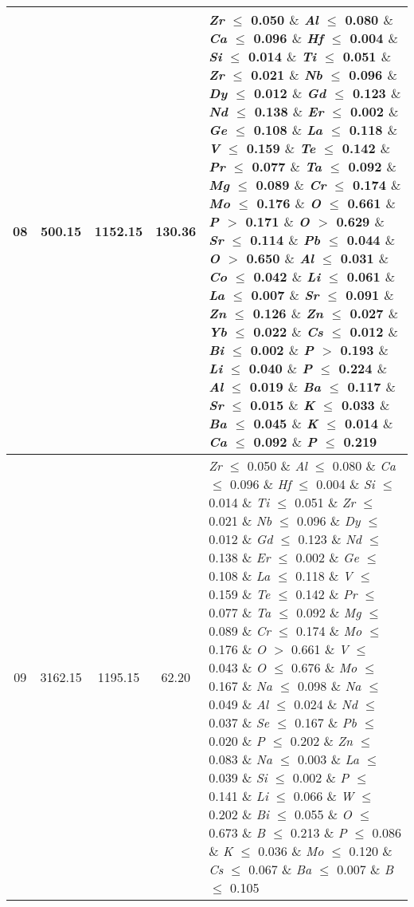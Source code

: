 \begin{table}[!htbp]
\begin{tabular}{ccccp{}}
		08 & 500.15 & 1152.15 & 130.36 & \textit{Zr} $\le$ 0.050 $\&$ \textit{Al} $\le$ 0.080 $\&$ \textit{Ca} $\le$ 0.096 $\&$ \textit{Hf} $\le$ 0.004 $\&$ \textit{Si} $\le$ 0.014 $\&$ \textit{Ti} $\le$ 0.051 $\&$ \textit{Zr} $\le$ 0.021 $\&$ \textit{Nb} $\le$ 0.096 $\&$ \textit{Dy} $\le$ 0.012 $\&$ \textit{Gd} $\le$ 0.123 $\&$ \textit{Nd} $\le$ 0.138 $\&$ \textit{Er} $\le$ 0.002 $\&$ \textit{Ge} $\le$ 0.108 $\&$ \textit{La} $\le$ 0.118 $\&$ \textit{V} $\le$ 0.159 $\&$ \textit{Te} $\le$ 0.142 $\&$ \textit{Pr} $\le$ 0.077 $\&$ \textit{Ta} $\le$ 0.092 $\&$ \textit{Mg} $\le$ 0.089 $\&$ \textit{Cr} $\le$ 0.174 $\&$ \textit{Mo} $\le$ 0.176 $\&$ \textit{O} $\le$ 0.661 $\&$ \textit{P} $>$ 0.171 $\&$ \textit{O} $>$ 0.629 $\&$ \textit{Sr} $\le$ 0.114 $\&$ \textit{Pb} $\le$ 0.044 $\&$ \textit{O} $>$ 0.650 $\&$ \textit{Al} $\le$ 0.031 $\&$ \textit{Co} $\le$ 0.042 $\&$ \textit{Li} $\le$ 0.061 $\&$ \textit{La} $\le$ 0.007 $\&$ \textit{Sr} $\le$ 0.091 $\&$ \textit{Zn} $\le$ 0.126 $\&$ \textit{Zn} $\le$ 0.027 $\&$ \textit{Yb} $\le$ 0.022 $\&$ \textit{Cs} $\le$ 0.012 $\&$ \textit{Bi} $\le$ 0.002 $\&$ \textit{P} $>$ 0.193 $\&$ \textit{Li} $\le$ 0.040 $\&$ \textit{P} $\le$ 0.224 $\&$ \textit{Al} $\le$ 0.019 $\&$ \textit{Ba} $\le$ 0.117 $\&$ \textit{Sr} $\le$ 0.015 $\&$ \textit{K} $\le$ 0.033 $\&$ \textit{Ba} $\le$ 0.045 $\&$ \textit{K} $\le$ 0.014 $\&$ \textit{Ca} $\le$ 0.092 $\&$ \textit{P} $\le$ 0.219\\
		\hline
		09 & 3162.15 & 1195.15 & 62.20 & \textit{Zr} $\le$ 0.050 $\&$ \textit{Al} $\le$ 0.080 $\&$ \textit{Ca} $\le$ 0.096 $\&$ \textit{Hf} $\le$ 0.004 $\&$ \textit{Si} $\le$ 0.014 $\&$ \textit{Ti} $\le$ 0.051 $\&$ \textit{Zr} $\le$ 0.021 $\&$ \textit{Nb} $\le$ 0.096 $\&$ \textit{Dy} $\le$ 0.012 $\&$ \textit{Gd} $\le$ 0.123 $\&$ \textit{Nd} $\le$ 0.138 $\&$ \textit{Er} $\le$ 0.002 $\&$ \textit{Ge} $\le$ 0.108 $\&$ \textit{La} $\le$ 0.118 $\&$ \textit{V} $\le$ 0.159 $\&$ \textit{Te} $\le$ 0.142 $\&$ \textit{Pr} $\le$ 0.077 $\&$ \textit{Ta} $\le$ 0.092 $\&$ \textit{Mg} $\le$ 0.089 $\&$ \textit{Cr} $\le$ 0.174 $\&$ \textit{Mo} $\le$ 0.176 $\&$ \textit{O} $>$ 0.661 $\&$ \textit{V} $\le$ 0.043 $\&$ \textit{O} $\le$ 0.676 $\&$ \textit{Mo} $\le$ 0.167 $\&$ \textit{Na} $\le$ 0.098 $\&$ \textit{Na} $\le$ 0.049 $\&$ \textit{Al} $\le$ 0.024 $\&$ \textit{Nd} $\le$ 0.037 $\&$ \textit{Se} $\le$ 0.167 $\&$ \textit{Pb} $\le$ 0.020 $\&$ \textit{P} $\le$ 0.202 $\&$ \textit{Zn} $\le$ 0.083 $\&$ \textit{Na} $\le$ 0.003 $\&$ \textit{La} $\le$ 0.039 $\&$ \textit{Si} $\le$ 0.002 $\&$ \textit{P} $\le$ 0.141 $\&$ \textit{Li} $\le$ 0.066 $\&$ \textit{W} $\le$ 0.202 $\&$ \textit{Bi} $\le$ 0.055 $\&$ \textit{O} $\le$ 0.673 $\&$ \textit{B} $\le$ 0.213 $\&$ \textit{P} $\le$ 0.086 $\&$ \textit{K} $\le$ 0.036 $\&$ \textit{Mo} $\le$ 0.120 $\&$ \textit{Cs} $\le$ 0.067 $\&$ \textit{Ba} $\le$ 0.007 $\&$ \textit{B} $\le$ 0.105\\

\end{tabular}
\end{table}
